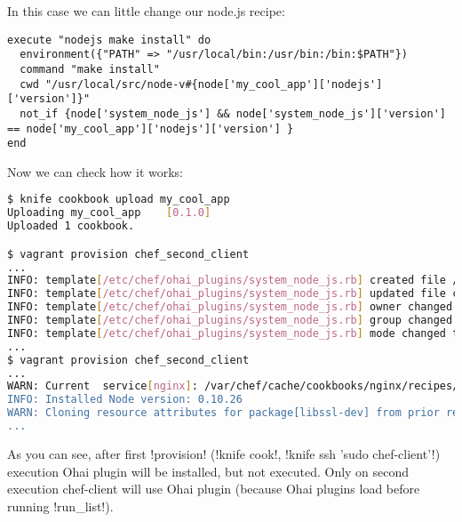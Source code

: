 In this case we can little change our node.js recipe:

\begin{lstlisting}[label=lst:cookbook-ohai7]
execute "nodejs make install" do
  environment({"PATH" => "/usr/local/bin:/usr/bin:/bin:$PATH"})
  command "make install"
  cwd "/usr/local/src/node-v#{node['my_cool_app']['nodejs']['version']}"
  not_if {node['system_node_js'] && node['system_node_js']['version'] == node['my_cool_app']['nodejs']['version'] }
end
\end{lstlisting}

Now we can check how it works:

\begin{lstlisting}[language=Bash,label=lst:cookbook-ohai8]
$ knife cookbook upload my_cool_app
Uploading my_cool_app    [0.1.0]
Uploaded 1 cookbook.

$ vagrant provision chef_second_client
...
INFO: template[/etc/chef/ohai_plugins/system_node_js.rb] created file /etc/chef/ohai_plugins/system_node_js.rb
INFO: template[/etc/chef/ohai_plugins/system_node_js.rb] updated file contents /etc/chef/ohai_plugins/system_node_js.rb
INFO: template[/etc/chef/ohai_plugins/system_node_js.rb] owner changed to 0
INFO: template[/etc/chef/ohai_plugins/system_node_js.rb] group changed to 0
INFO: template[/etc/chef/ohai_plugins/system_node_js.rb] mode changed to 755
...
$ vagrant provision chef_second_client
...
WARN: Current  service[nginx]: /var/chef/cache/cookbooks/nginx/recipes/source.rb:123:in `from_file'
INFO: Installed Node version: 0.10.26
WARN: Cloning resource attributes for package[libssl-dev] from prior resource (CHEF-3694)
...
\end{lstlisting}

As you can see, after first \inline!provision! (\inline!knife cook!, \inline!knife ssh 'sudo chef-client'!) execution Ohai plugin will be installed, but not executed. Only on second execution chef-client will use Ohai plugin (because Ohai plugins load before running \inline!run_list!).
